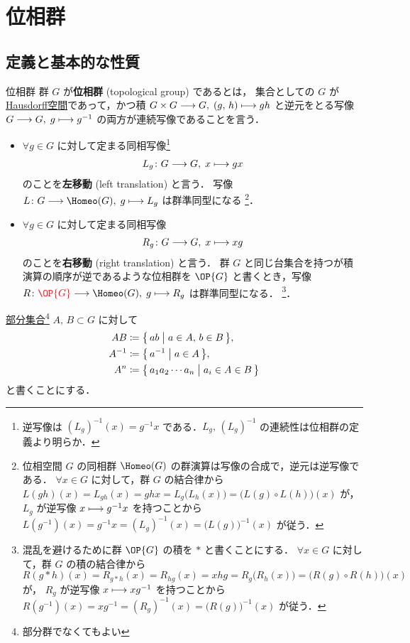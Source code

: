\documentclass[algtopo_main]{subfiles}
\begin{document}
\setcounter{chapter}{2}

\chapter{位相群}

\section{定義と基本的な性質}

\begin{mydef}[label=def:TG]{位相群}
    群 $G$ が\textbf{位相群} (topological group) であるとは，
    集合としての $G$ が\underline{Hausdorff空間}であって，かつ積 $G \times G \longrightarrow G,\; (g,\, h) \longmapsto gh$ と逆元をとる写像 $G \longrightarrow G,\; g \longmapsto g^{-1}$ の両方が連続写像であることを言う．
\end{mydef}

\begin{itemize}
    \item $\forall g \in G$ に対して定まる同相写像\footnote{逆写像は $(L_g)^{-1} (x) = g^{-1} x$ である．$L_g,\, (L_g)^{-1}$ の連続性は位相群の定義より明らか．}
    \begin{align}
        L_g \colon G \longrightarrow G,\; x \longmapsto gx
    \end{align}
    のことを\textbf{左移動} (left translation) と言う．
    写像 $L \colon G \lto \Homeo (G),\; g \lmto L_g$ は群準同型になる
    \footnote{
        位相空間 $G$ の同相群 $\Homeo(G)$ の群演算は写像の合成で，逆元は逆写像である．
        $\forall x \in G$ に対して，群 $G$ の結合律から $L(gh)(x) = L_{gh}(x) = ghx = L_g \bigl( L_h(x)\bigr) = \bigl(L(g) \circ L(h)\bigr)(x)$ が，
        $L_g$ が逆写像 $x \longmapsto g^{-1} x$ を持つことから $L(g^{-1})(x) = g^{-1} x = (L_g)^{-1}(x) = \bigl( L(g) \bigr)^{-1} (x)$ が従う．
    }．
    \item $\forall g \in G$ に対して定まる同相写像
    \begin{align}
        R_g \colon G \longrightarrow G,\; x \longmapsto xg
    \end{align}
    のことを\textbf{右移動} (right translation) と言う．
    群 $G$ と同じ台集合を持つが積演算の順序が逆であるような位相群を $\OP{G}$ と書くとき，写像 $R \colon \textcolor{red}{\OP{G}} \lto \Homeo (G),\; g \lmto R_g$ は群準同型になる．
    \footnote{
        混乱を避けるために群 $\OP{G}$ の積を $*$ と書くことにする．
        $\forall x \in G$ に対して，群 $G$ の積の結合律から $R(g*h)(x) = R_{g*h}(x) = R_{hg}(x) = xhg = R_g \bigl( R_h(x)\bigr) = \bigl(R(g) \circ R(h)\bigr)(x)$ が，
        $R_g$ が逆写像 $x \longmapsto x g^{-1}$ を持つことから $R(g^{-1})(x) = x g^{-1} = (R_g)^{-1}(x) = \bigl( R(g) \bigr)^{-1} (x)$ が従う．
    }． 
\end{itemize}
\underline{部分集合}\footnote{部分群でなくてもよい} $A,\, B \subset G$ に対して
\begin{align}
    AB &\coloneqq \bigl\{\, ab \bigm| a \in A,\, b \in B \,\bigr\}, \\
    A^{-1} &\coloneqq \bigl\{\, a^{-1} \bigm| a \in A \,\bigr\}, \\
    A^n &\coloneqq \bigl\{\, a_1 a_2 \cdots a_n \bigm| a_i \in A \in B \,\bigr\}
\end{align}
と書くことにする．
\end{document}
